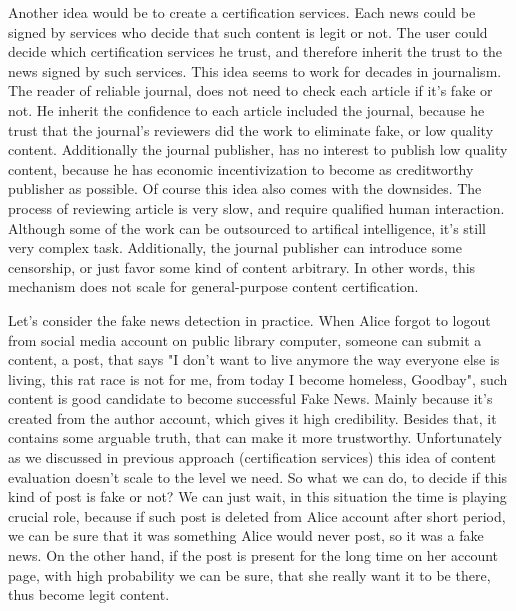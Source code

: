 \documentclass[nostrict]{szablonPG}
\begin{document}
Another idea would be to create a certification services. Each news could be signed by services who decide that such content is legit or not. The user could decide which certification services he trust, and therefore inherit the trust to the news signed by such services. This idea seems to work for decades in journalism. The reader of reliable journal, does not need to check each article if it's fake or not. He inherit the confidence to each article included the journal, because he trust that the journal's reviewers did the work to eliminate fake, or low quality content. Additionally the journal publisher, has no interest to publish low quality content, because he has economic incentivization to become as creditworthy publisher as possible.
Of course this idea also comes with the downsides. The process of reviewing article is very slow, and require qualified human interaction. Although some of the work can be outsourced to artifical intelligence, it's still very complex task. Additionally, the journal publisher can introduce some censorship, or just favor some kind of content arbitrary. In other words, this mechanism does not scale for general-purpose content certification.

Let's consider the fake news detection in practice. When Alice forgot to logout from social media account on public library computer, someone can submit a content, a post, that says "I don't want to live anymore the way everyone else is living, this rat race is not for me, from today I become homeless, Goodbay", such content is good candidate to become successful Fake News. Mainly because it's created from the author account, which gives it high credibility. Besides that, it contains some arguable truth, that can make it more trustworthy. Unfortunately as we discussed in previous approach (certification services) this idea of content evaluation doesn't scale to the level we need. So what we can do, to decide if this kind of post is fake or not? We can just wait, in this situation the time is playing crucial role, because if such post is deleted from Alice account after short period, we can be sure that it was something Alice would never post, so it was a fake news. On the other hand, if the post is present for the long time on her account page, with high probability we can be sure, that she really want it to be there, thus become legit content.
\end{document}
